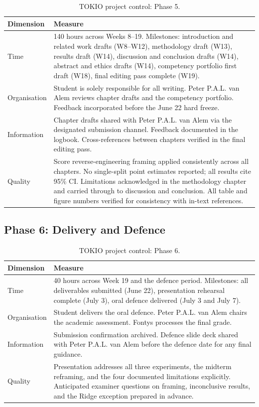 \documentclass[11pt,a4paper]{article}
\begin{document}
\begin{table}[H]
  \centering
  \caption{TOKIO project control: Phase 5.}
  \label{tab:tokio5}
  \small
  \begin{tabular}{p{2.2cm} p{11cm}}
    \toprule
    \textbf{Dimension} & \textbf{Measure} \\
    \midrule
    Time         & 140 hours across Weeks 8--19. Milestones: introduction and related work drafts (W8--W12), methodology draft (W13), results draft (W14), discussion and conclusion drafts (W14), abstract and ethics drafts (W14), competency portfolio first draft (W18), final editing pass complete (W19). \\
    Organisation & Student is solely responsible for all writing. Peter P.A.L. van Alem reviews chapter drafts and the competency portfolio. Feedback incorporated before the June 22 hard freeze. \\
    Information  & Chapter drafts shared with Peter P.A.L. van Alem via the designated submission channel. Feedback documented in the logbook. Cross-references between chapters verified in the final editing pass. \\
    Quality      & Score reverse-engineering framing applied consistently across all chapters. No single-split point estimates reported; all results cite 95\% CI. Limitations acknowledged in the methodology chapter and carried through to discussion and conclusion. All table and figure numbers verified for consistency with in-text references. \\
    \bottomrule
  \end{tabular}
\end{table}

\subsection{Phase 6: Delivery and Defence}

\begin{table}[H]
  \centering
  \caption{TOKIO project control: Phase 6.}
  \label{tab:tokio6}
  \small
  \begin{tabular}{p{2.2cm} p{11cm}}
    \toprule
    \textbf{Dimension} & \textbf{Measure} \\
    \midrule
    Time         & 40 hours across Week 19 and the defence period. Milestones: all deliverables submitted (June 22), presentation rehearsal complete (July 3), oral defence delivered (July 3 and July 7). \\
    Organisation & Student delivers the oral defence. Peter P.A.L. van Alem chairs the academic assessment. Fontys processes the final grade. \\
    Information  & Submission confirmation archived. Defence slide deck shared with Peter P.A.L. van Alem before the defence date for any final guidance. \\
    Quality      & Presentation addresses all three experiments, the midterm reframing, and the four documented limitations explicitly. Anticipated examiner questions on framing, inconclusive results, and the Ridge exception prepared in advance. \\
    \bottomrule
  \end{tabular}
\end{table}
\end{document}

